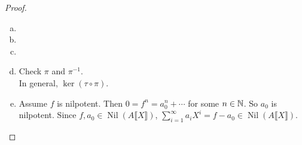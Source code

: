 \begin{proof}
    \begin{enumerate}[(a)]
        \item 
        \item
        \item 
        \item 
            \begin{center}
                \begin{tikzcd}
                \end{tikzcd}
            \end{center}
            Check $\pi$ and $\pi^{-1}$. \\
            In general, $\ker(\tau \circ \pi)$.
        \item 
            Assume $f$ is nilpotent. Then $0 = f^n = a_0^n + \cdots $ for some $n \in \bbN$. So $a_0$ is nilpotent. Since $f,a_0 \in \operatorname{Nil}(A \llbracket X \rrbracket)$, $\sum_{i=1}^\infty a_iX^i = f-a_0 \in \operatorname{Nil}(A \llbracket X \rrbracket)$.
    \end{enumerate}
\end{proof}

